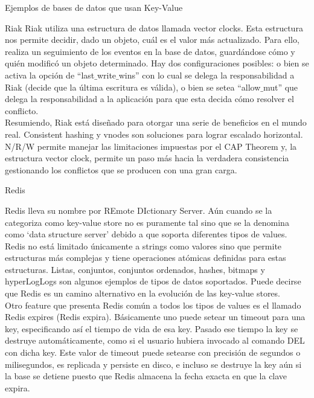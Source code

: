\begin{section}{Ejemplos de bases de datos que usan Key-Value}
\begin{subsection}{Riak}
Riak utiliza una estructura de datos llamada vector clocks. Esta estructura nos permite decidir, dado un objeto, cuál es el valor más actualizado. Para ello, realiza un seguimiento de los eventos en la base de datos, guardándose cómo y quién modificó un objeto determinado. Hay dos configuraciones posibles: o bien se activa la opción de “last$\_$write$\_$wins” con lo cual se delega la responsabilidad a Riak (decide que la última escritura es válida), o bien se setea “allow$\_$mut” que delega la responsabilidad a la aplicación para que esta decida cómo resolver el conflicto.\\

Resumiendo, Riak está diseñado para otorgar una serie de beneficios en el mundo real. Consistent hashing y vnodes son soluciones para lograr escalado horizontal. N/R/W permite manejar las limitaciones impuestas por el CAP Theorem y, la estructura vector clock, permite un paso más hacia la verdadera consistencia gestionando los conflictos que se producen con una gran carga. \\

\end{subsection}

\begin{subsection}{Redis}

Redis lleva su nombre por REmote DIctionary Server. Aún cuando se la categoriza como key-value store no es puramente tal sino que se la denomina como ‘data structure server’ debido a que soporta diferentes tipos de values. Redis no está limitado únicamente a strings como valores sino que permite estructuras más complejas y tiene operaciones atómicas definidas para estas estructuras. Listas, conjuntos, conjuntos ordenados, hashes, bitmaps y hyperLogLogs son algunos ejemplos de tipos de datos soportados. Puede decirse que Redis es un camino alternativo en la evolución de las key-value stores. \\

Otro feature que presenta Redis común a todos los tipos de values es el llamado Redis expires (Redis expira). Básicamente uno puede setear un timeout para una key, especificando así el tiempo de vida de esa key. Pasado ese tiempo la key se destruye automáticamente, como si el usuario hubiera invocado al comando DEL con dicha key. Este valor de timeout puede setearse con precisión de segundos o milisegundos, es replicada y persiste en disco, e incluso se destruye la key aún si la base se detiene puesto que Redis almacena la fecha exacta en que la clave expira. \\


\end{subsection}
\end{section}
